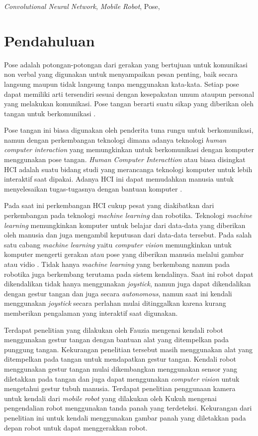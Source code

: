 \documentclass[conference]{IEEEtran}
\begin{document}
\begin{IEEEkeywords}
    \textit{Convolutional Neural Network}, \emph{Mobile Robot}, Pose,
\end{IEEEkeywords}

\section{Pendahuluan}
Pose adalah potongan-potongan dari gerakan yang bertujuan untuk komunikasi non verbal yang digunakan untuk menyampaikan pesan penting, baik secara langsung maupun tidak langsung tanpa menggunakan kata-kata. Setiap pose dapat memiliki arti tersendiri sesuai dengan kesepakatan umum ataupun personal yang melakukan komunikasi. Pose tangan berarti suatu sikap yang diberikan oleh tangan untuk berkomunikasi \cite{g1}. \par
Pose tangan ini biasa digunakan oleh penderita tuna rungu untuk berkomunikasi, namun dengan perkembangan teknologi dimana adanya teknologi \textit{human computer interaction} yang memungkinkan untuk berkomunikasi dengan komputer menggunakan pose tangan. \textit{Human Computer Interacttion} atau biasa disingkat HCI adalah suatu bidang studi yang merancanga teknologi komputer untuk lebih interaktif saat dipakai. Adanya HCI ini dapat memudahkan manusia untuk menyelesaikan tugas-tugasnya dengan bantuan komputer \cite{g4}. \par
Pada saat ini perkembangan HCI cukup pesat yang diakibatkan dari perkembangan pada teknologi \textit{machine learning} dan robotika. Teknologi \textit{machine learning} memungkinkan komputer untuk belajar dari data-data yang diberikan oleh manusia dan juga mengambil keputusan dari data-data tersebut. Pada salah satu cabang \textit{machine learning} yaitu \textit{computer vision} memungkinkan untuk komputer mengerti gerakan atau pose yang diberikan manusia melalui gambar atau vidio \cite{g3}. Tidak hanya \textit{machine learning} yang berkembang namun pada robotika juga berkembang terutama pada sistem kendalinya. Saat ini robot dapat dikendalikan tidak hanya menggunakan \textit{joystick}, namun juga dapat dikendalikan dengan gestur tangan dan juga secara  \textit{autonomous}, namun saat ini kendali menggunakan \textit{joystick} secara perlahan mulai ditinggalkan karena kurang memberikan pengalaman yang interaktif saat digunakan\cite{g2}. \par
Terdapat penelitian yang dilakukan oleh Fauzia \cite{g5} mengenai kendali robot menggunakan gestur tangan dengan bantuan alat yang ditempelkan pada punggung tangan. Kekurangan penelitian tersebut masih menggunakan alat yang ditempelkan pada tangan untuk mendapatkan gestur tangan. Kendali robot menggunakan gestur tangan mulai dikembangkan menggunakan sensor yang diletakkan pada tangan dan juga dapat menggunakan \textit{computer vision} untuk mengetahui gestur tubuh manusia. Terdapat penelitian penggunaan kamera untuk kendali dari \textit{mobile robot} yang dilakukan oleh Kukuh \cite{g6} mengenai pengendalian robot menggunakan tanda panah yang terdeteksi. Kekurangan dari penelitian ini untuk kendali menggunakan gambar panah yang diletakkan pada depan robot untuk dapat menggerakkan robot.\par
\end{document}

